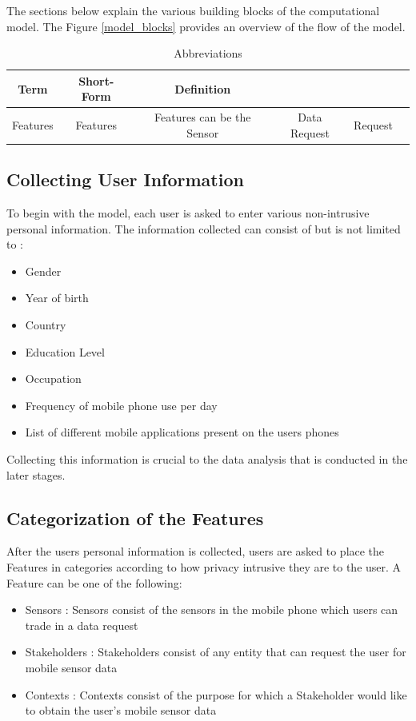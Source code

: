 The sections below explain the various building blocks of the computational model. The Figure \ref{model_blocks}
provides an overview of the flow of the model.

\begin{table}[h!]
  \centering
  \caption{Abbreviations}
  \label{tab:emp_sensors}
  \begin{tabular}{cccccc}
    \toprule
     Term	&	Short-Form	&	Definition\\
    \midrule
    Features &	Features & Features can be the 
    	Sensor    &
     Data Request	& 	Request	&		\\
    \bottomrule
  \end{tabular}
\end{table}

\subsection{Collecting User Information}
To begin with the model, each user is asked to enter various non-intrusive personal information. The information collected can consist of but is not limited to :

\begin{itemize}
\item Gender
\item Year of birth
\item Country
\item Education Level
\item Occupation
\item Frequency of mobile phone use per day
\item List of different mobile applications present on the users phones
\end{itemize}

Collecting this information is crucial to the data analysis that is conducted in the later stages.
\subsection{Categorization of the Features} \label{catfeatures}
After the users personal information is collected, users are asked to place the Features in categories according to how privacy intrusive they are to the user.
A Feature can be one of the following:

\begin{itemize}
\item Sensors : Sensors consist of the sensors in the mobile phone which users
can trade in a data request
\item Stakeholders : Stakeholders
consist of any entity that can request the user for mobile sensor data
\item Contexts : Contexts consist of the purpose for which a Stakeholder would like to obtain the user's mobile sensor data
\end{itemize}

